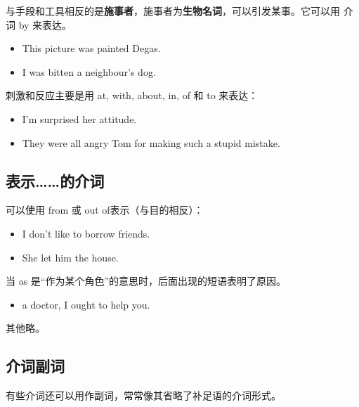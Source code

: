 与手段和工具相反的是\textbf{施事者}，施事者为\textbf{生物名词}，可以引发某事。它可以用
介词 by 来表达。
\begin{itemize}
\item This picture was painted  Degas.

\item I was bitten  a neighbour's dog.
\end{itemize}

刺激和反应主要是用 at, with, about, in, of 和 to 来表达：
\begin{itemize}
\item I'm surprised  her attitude.

\item They were all angry  Tom for making such a stupid mistake.

\end{itemize}

\subsection{表示……的介词}

可以使用 from 或 out of表示（与目的相反）：
\begin{itemize}
\item I don't like to borrow  friends.

\item She let him  the house.
\end{itemize}

当 as 是“作为某个角色”的意思时，后面出现的短语表明了原因。
\begin{itemize}
\item {} a doctor, I ought to help you.
\end{itemize}

其他略。

\subsection{介词副词}

有些介词还可以用作副词，常常像其省略了补足语的介词形式。



